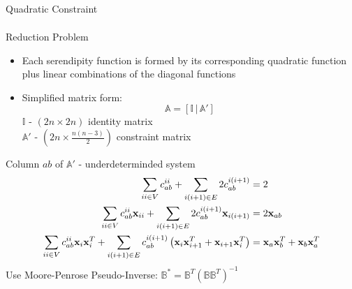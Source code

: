 \documentclass[compress,10pt]{beamer}
\renewcommand{\vec}[1]{\mathbf{#1}}
\begin{document}
\begin{frame}[t]
{\begin{block}{Quadratic Constraint}
{\begin{equation*}
\begin{aligned}
\end{aligned}
\end{equation*}
}\end{block}
}
{
{\small
\vspace{-3mm}
\begin{block}{Reduction Problem}
\begin{itemize}
\item Each serendipity function is formed by its corresponding quadratic function plus linear combinations of the diagonal functions
\item Simplified matrix form:
\begin{equation*}
\mathbb{A} = \left[  \mathbb{I} \, | \, \mathbb{A}' \right]
\end{equation*}
$\mathbb{I}$ - $(2n \times 2n)$ identity matrix \\
$\mathbb{A}'$ - $(2n \times \frac{n(n-3)}{2})$ constraint matrix
\end{itemize}
\end{block}
\vspace{-3mm}
\begin{block}{Column $ab$ of $\mathbb{A}'$ - underdeterminded system}
\begin{equation*}
\begin{aligned}
\sum\displaylimits_{ii \in V} c_{ab}^{ii} + \sum\displaylimits_{i(i+1) \in E} 2 c_{ab}^{i(i+1)} &= 2 \\
\sum\displaylimits_{ii \in V} c_{ab}^{ii} \vec{x}_{ii} + \sum\displaylimits_{i(i+1) \in E} 2 c_{ab}^{i(i+1)} \vec{x}_{i (i+1)} &= 2 \vec{x}_{ab}\\
\sum\displaylimits_{ii \in V} c_{ab}^{ii} \vec{x}_{i} \vec{x}_{i}^T + \sum\displaylimits_{i(i+1) \in E} c_{ab}^{i(i+1)} \left(  \vec{x}_{i} \vec{x}_{i+1}^T + \vec{x}_{i+1} \vec{x}_{i}^T  \right) &= \vec{x}_{a} \vec{x}_{b}^T + \vec{x}_{b} \vec{x}_{a}^T
\end{aligned}
\end{equation*}
\vspace{2mm}
Use Moore-Penrose Pseudo-Inverse: $\mathbb{B}^* = \mathbb{B}^T (\mathbb{B} \mathbb{B}^T)^{-1}$
\end{block}
}
}
\end{frame}
\end{document}
